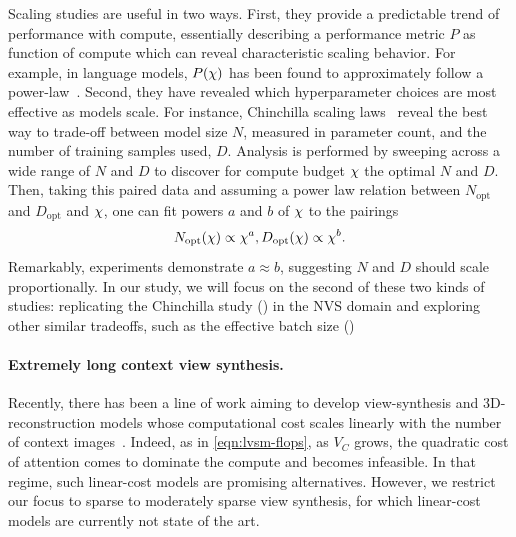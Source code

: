 Scaling studies are useful in two ways. First, they provide a predictable trend of performance with compute, essentially describing a performance metric $P$ as function of compute \compute{} which can reveal characteristic scaling behavior. For example, in language models, $P(\chi{})$ has been found to approximately follow a power-law~\citep{kaplan2020scaling}. Second, they have revealed which hyperparameter choices are most effective as models scale. For instance,  Chinchilla scaling laws~\cite{hoffmann2022training} reveal the best way to trade-off between model size $N$, measured in parameter count, and the number of training samples used, $D$. Analysis is performed by sweeping across a wide range of $N$ and $D$ to discover for compute budget $\chi{}$ the optimal $N$ and $D$. Then, taking this paired data and assuming a power law relation between $N_{\text{opt}}$ and $D_{\text{opt}}$ and $\chi{}$, one can fit powers $a$ and $b$ of $\chi{}$ to the pairings
\begin{equation}\label{eqn:chinchilla}
    N_{\text{opt}}(\chi{}) \propto \chi{}^a, D_{\text{opt}}(\chi) \propto \chi{}^b.
\end{equation}
Remarkably, experiments demonstrate $a \approx b$, suggesting  $N$ and $D$ should scale proportionally. In our study, we will focus on the second of these two kinds of studies: replicating the Chinchilla study () in the NVS domain and exploring other similar tradeoffs, such as the effective batch size ()


\paragraph{Extremely long context view synthesis.}
%
Recently, there has been a line of work aiming to develop view-synthesis and 3D-reconstruction models whose computational cost scales linearly with the number of context images~\citep{zhang2025test,wang2025continuous, ziwen2025llrm}. Indeed, as in \eqref{eqn:lvsm-flops}, as $V_C$ grows, the quadratic cost of attention comes to dominate the compute and becomes infeasible. In that regime, such linear-cost models are promising alternatives. However, we restrict our focus to sparse to moderately sparse view synthesis, for which linear-cost models are currently not state of the art.











